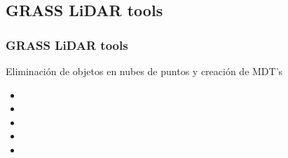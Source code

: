 \subsection{GRASS LiDAR tools}
\begin{frame}
  \frametitle{GRASS LiDAR tools}
  Eliminación de objetos en nubes de puntos y creación de MDT's
  \begin{minipage}{0.35\textwidth}
  \begin{itemize}
    \item<2-> 
    \item<3-> 
    \item<4-> 
    \item<5-> 
    \item<6-> 
  \end{itemize}
  \end{minipage}
  \begin{minipage}{0.65\textwidth}
  \end{minipage}
\end{frame}
